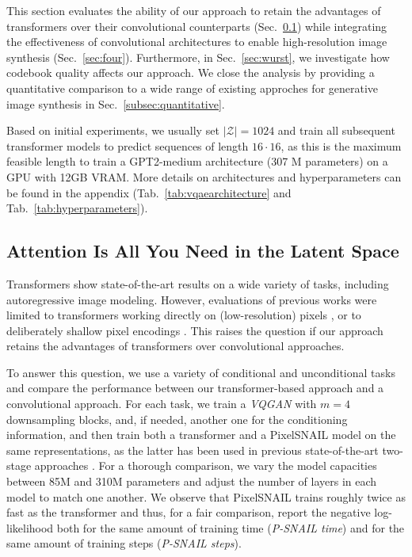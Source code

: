  This section evaluates the ability of our approach to retain the advantages of transformers over their convolutional counterparts
(Sec.~\ref{sec:psnailvstrafo}) while integrating the effectiveness of convolutional architectures to enable high-resolution image synthesis
(Sec.~\ref{sec:four}). Furthermore, in Sec.~\ref{sec:wurst}, we investigate how codebook quality affects our approach. We close the analysis by providing a quantitative comparison to a wide range of existing approches for generative image synthesis in Sec.~\ref{subsec:quantitative}. 

Based on initial experiments, we usually set $\vert
\mathcal{Z} \vert=1024$ and train all subsequent transformer models to predict sequences of length $16\cdot 16$, as this is the maximum feasible length to train a GPT2-medium architecture (307 M parameters) \cite{Radford2019LanguageMA} on a GPU with 12GB VRAM. More details on architectures and hyperparameters can be found in the appendix (Tab.~\ref{tab:vqaearchitecture} and Tab.~\ref{tab:hyperparameters}).

\subsection{Attention Is All You Need in the Latent Space}
\label{sec:psnailvstrafo}

 Transformers show state-of-the-art results on a wide variety of tasks, including autoregressive image modeling. However, evaluations of previous works were limited to transformers working directly on (low-resolution) pixels \cite{parmar2018image,child2019generating,ho2019axial}, or to deliberately shallow pixel encodings \cite{chen2020generative}. This raises the question if our approach retains the advantages of transformers over convolutional approaches.

To answer this question, we use a variety of conditional and unconditional tasks and compare the performance between our transformer-based approach and a convolutional approach. For each task, we train a \emph{VQGAN} with $m=4$ downsampling blocks, and, if needed, another one for the conditioning information, and then train both a transformer and a PixelSNAIL \cite{chen2018pixelsnail} model on the same representations, as the latter has been used in previous state-of-the-art two-stage approaches \cite{razavi2019generating}. For a thorough comparison, we vary the model capacities between 85M and 310M parameters and adjust the number of layers in each model to match one another. We observe that PixelSNAIL trains roughly twice as fast as the transformer and thus, for a fair comparison, report the negative log-likelihood both for the same amount of training time (\emph{P-SNAIL time}) and for the same amount of training steps (\emph{P-SNAIL steps}).

